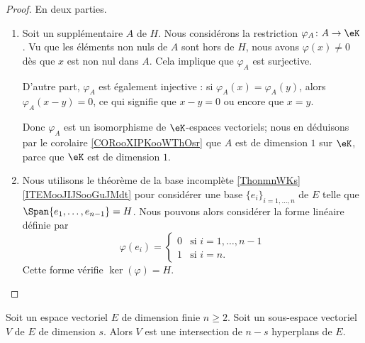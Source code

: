 \begin{proof}
    En deux parties.
    \begin{enumerate}
        \item
            Soit un supplémentaire \( A\) de \( H\). Nous considérons la restriction \( \varphi_A\colon A\to \eK\). Vu que les éléments non nuls de \( A\) sont hors de \( H\), nous avons \( \varphi(x)\neq 0\) dès que \( x\) est non nul dans \( A\). Cela implique que \( \varphi_A\) est surjective.

            D'autre part, \( \varphi_A\) est également injective : si \( \varphi_A(x)=\varphi_A(y)\), alors \( \varphi_A(x-y)=0\), ce qui signifie que \( x-y=0\) ou encore que \( x=y\).

            Donc \( \varphi_A\) est un isomorphisme de \( \eK\)-espaces vectoriels; nous en déduisons par le corolaire \ref{CORooXIPKooWThOsr} que \( A\) est de dimension \( 1\) sur \( \eK\), parce que \( \eK\) est de dimension \( 1\).

        \item
            Nous utilisons le théorème de la base incomplète \ref{ThonmnWKs}\ref{ITEMooJIJSooGuJMdt} pour considérer une base \( \{ e_i \}_{i=1,\ldots, n}\) de \( E\) telle que \( \Span\{ e_1,\ldots, e_{n-1} \}=H\). Nous pouvons alors considérer la forme linéaire définie par
            \begin{equation}
                \varphi(e_i)=\begin{cases}
                    0    &   \text{si }  i=1,\ldots, n-1\\
                    1    &    \text{si } i=n.
                \end{cases}
            \end{equation}
            Cette forme vérifie \( \ker(\varphi)=H\).
    \end{enumerate}
\end{proof}

\begin{proposition}
    Soit un espace vectoriel \( E\) de dimension finie \( n\geq 2\). Soit un sous-espace vectoriel \( V\) de \( E\) de dimension \( s\). Alors \( V\) est une intersection de \( n-s\) hyperplans de \( E\).
\end{proposition}

